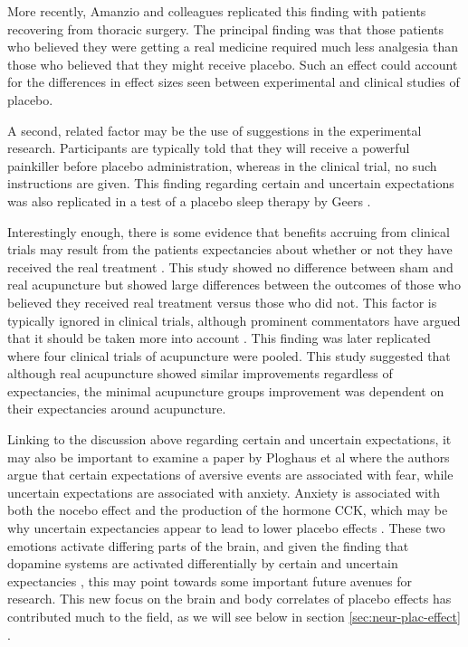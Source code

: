 More recently,  Amanzio and colleagues \cite{Amanzio2001} replicated this finding with patients recovering from thoracic surgery. The principal finding was that those patients who believed they were getting a real medicine required much less analgesia than those who believed that they might receive placebo. Such an effect could account for the differences in effect sizes seen between experimental and clinical studies of placebo. 

A second, related factor may be the use of suggestions in the experimental research. Participants are typically told that they will receive a powerful painkiller before placebo administration, whereas in the clinical trial, no such instructions are given. This finding regarding certain and uncertain expectations was also replicated in a test of a placebo sleep therapy by Geers  \cite{Geers2005a}.

Interestingly enough, there is some evidence that benefits accruing from clinical trials may result from the patients expectancies about whether or not they have received the real treatment \cite{Bausell2005}. This study showed no difference between sham and real acupuncture but showed large differences between the outcomes of those who believed they received real treatment versus those who did not. This factor is typically ignored in clinical trials, although prominent commentators have argued that it should be taken more into account \cite{Benedetti2007}. This finding was later replicated \cite{Linde2007}  where four clinical trials of acupuncture were pooled. This study suggested that although real acupuncture showed similar improvements regardless of expectancies, the minimal acupuncture groups improvement was dependent on their expectancies around acupuncture.  

Linking to the discussion above regarding certain and uncertain expectations, it may also be important to examine a paper by Ploghaus et al \cite{Ploghaus2003} where the authors argue that certain expectations of aversive events are associated with fear, while uncertain expectations are associated with anxiety. Anxiety is associated with both the nocebo effect and the production of the hormone CCK, which may be why uncertain expectancies appear to lead to lower placebo effects \cite{Colloca2008b}. These two emotions activate differing parts of the brain, and given the finding that dopamine systems are activated differentially by certain and uncertain expectancies \cite{Scott2007a}, this may point towards some important future avenues for research. This new focus on the brain and body correlates of placebo effects has contributed much to the field, as we will see below in section \ref{sec:neur-plac-effect} .



